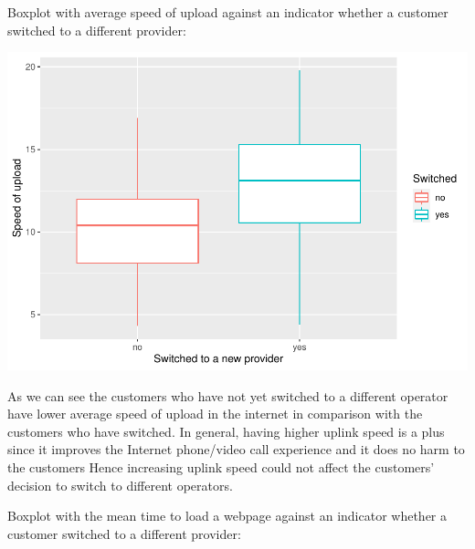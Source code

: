 \documentclass[
]{article}
\newenvironment{Shaded}{\begin{snugshade}}{\end{snugshade}}
\newcommand{\DataTypeTok}[1]{\textcolor[rgb]{0.13,0.29,0.53}{#1}}
\newcommand{\KeywordTok}[1]{\textcolor[rgb]{0.13,0.29,0.53}{\textbf{#1}}}
\newcommand{\NormalTok}[1]{#1}
\newcommand{\OperatorTok}[1]{\textcolor[rgb]{0.81,0.36,0.00}{\textbf{#1}}}
\newcommand{\StringTok}[1]{\textcolor[rgb]{0.31,0.60,0.02}{#1}}
\begin{document}
Boxplot with average speed of upload against an indicator whether a
customer switched to a different provider:

\begin{Shaded}
\end{Shaded}

\includegraphics{Report_files/figure-latex/unnamed-chunk-2-1.pdf}

As we can see the customers who have not yet switched to a different
operator have lower average speed of upload in the internet in
comparison with the customers who have switched. In general, having
higher uplink speed is a plus since it improves the Internet phone/video
call experience and it does no harm to the customers Hence increasing
uplink speed could not affect the customers' decision to switch to
different operators.

Boxplot with the mean time to load a webpage against an indicator
whether a customer switched to a different provider:
\end{document}
